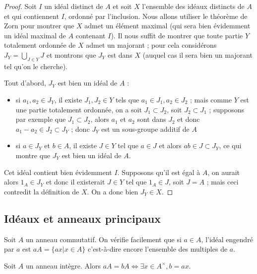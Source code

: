 \begin{proof}
Soit $I$ un idéal distinct de $A$ et soit $X$ l'ensemble des
idéaux distincts de $A$ et qui contiennent $I$, ordonné par l'inclusion.
Nous allons utiliser le théorème de Zorn pour montrer que $X$ admet un
élément maximal (qui sera bien évidemment un idéal maximal de $A$
contenant $I$). Il nous suffit de montrer que toute partie $Y$ totalement
ordonnée de $X$ admet un majorant ; pour cela considérons $J_Y = \bigcup_{J \in Y} J$
et montrons que $J_Y$ est dans $X$ (auquel cas il sera bien un
majorant tel qu'on le cherche).

Tout d'abord, $J_Y$ est bien un idéal de $A$ :

\begin{itemize}
\itemsep1pt\parskip0pt
\item
  si $a_1, a_2 \in J_Y$, il existe
  $J_1, J_2 \in Y$ tels que $a_1 \in J_1, a_2 \in J_2$ ; mais comme $Y$ est une partie
  totalement ordonnée, on a soit $J_1 \subset J_2$, soit
  $J_2 \subset J_1$ ; supposons par exemple que $J_1 \subset J_2$, alors $a_1$ et $a_2$ sont dans
  $J_2$ et donc $a_1 - a_2 \in J_2 \subset J_Y$ ; donc $J_Y$ est un sous-groupe additif de $A$
\item
  si $a \in J_Y$ et $b \in A$, il existe $J \in Y$ tel que $a \in J$ et alors $ab \in J \subset J_Y$, ce qui montre que $J_Y$ est bien un idéal
  de $A$.
\end{itemize}

Cet idéal contient bien évidemment $I$. Supposons qu'il est égal à $A$, on
aurait alors $1_A \in J_Y$ et donc il existerait $J \in Y$ tel
que $1_A \in J$, soit $J = A$ ; mais ceci contredit la définition de
$X$. On a donc bien $J_Y \in X$.
\end{proof}

\subsection{Idéaux et anneaux principaux}

\begin{rem}
Soit $A$ un anneau commutatif. On vérifie facilement que si
$a \in A$, l'idéal engendré par $a$ est $aA = \{ax | x \in A\}$
c'est-à-dire encore l'ensemble des multiples de $a$.
\end{rem}

\begin{prop}
Soit $A$ un anneau intègre. Alors $aA = bA \Leftrightarrow \exists x \in A^\times, b = ax$.
\end{prop}

